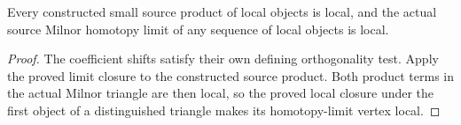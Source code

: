 \begin{proposition}
  \label{prop:actual-local-milnor-closure}
  \leanok
  Every constructed small source product of local objects is local, and the actual source Milnor homotopy limit of any sequence of local objects is local.
\end{proposition}
\begin{proof}
  The coefficient shifts satisfy their own defining orthogonality test. Apply the proved limit closure to the constructed source product. Both product terms in the actual Milnor triangle are then local, so the proved local closure under the first object of a distinguished triangle makes its homotopy-limit vertex local.
  \leanok
\end{proof}

